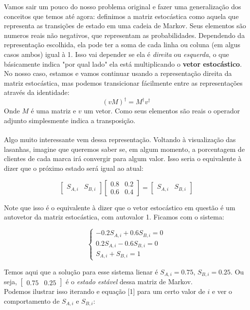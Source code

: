 \documentclass[12pt]{article}
\begin{document}
Vamos sair um pouco do nosso problema original e fazer uma generalização dos conceitos que temos até agora: definimos a matriz estocástica como aquela que representa as transições de estado em uma cadeia de Markov. Seus elementos são numeros reais não negativos, que representam as probabilidades. Dependendo da representação escolhida, ela pode ter a soma de cada linha ou coluna (em algus casos ambos) igual à 1. Isso vai depender se ela é \textit{direita} ou \textit{esquerda}, o que básicamente indica "por qual lado" ela está multiplicando o \textbf{vetor estocástico}. No nosso caso, estamos e vamos continuar usando a representação direita da matriz estocástica, mas podemos transicionar fácilmente entre as representações através da identidade:
\begin{equation}
(vM)^{\dagger} = M^{\dagger} v^{\dagger}
\end{equation}
Onde $M$ é uma matriz e $v$ um vetor. Como seus elementos são reais o operador adjunto simplesmente indica a transposição.\\
\\
Algo muito interessante vem dessa representação. Voltando à visualização das lasanhas, imagine que queremos saber se, em algum momento, a porcentagem de clientes de cada marca irá convergir para algum valor. Isso seria o equivalente à dizer que o próximo estado será igual ao atual:

$$
\begin{bmatrix}
S_{A, i} & S_{B, i}
\end{bmatrix}
\begin{bmatrix}
0.8 & 0.2\\
0.6 & 0.4
\end{bmatrix}
=
\begin{bmatrix}
S_{A, i} & S_{B, i}
\end{bmatrix}
$$

Note que isso é o equivalente à dizer que o vetor estocástico em questão é um autovetor da matriz estocástica, com autovalor 1. Ficamos com o sistema:

$$
\left\{
\begin{array}{ll}
-0.2 S_{A, i} + 0.6 S_{B, i} = 0\\
0.2 S_{A, i}  - 0.6 S_{B, i} = 0\\
S_{A, i} + S_{B, i} = 1
\end{array}\right.
$$

Temos aqui que a solução para esse sistema lienar é $S_{A, i} = 0.75$, $S_{B, i} = 0.25$. Ou seja, $\begin{bmatrix} 0.75 & 0.25 \end{bmatrix}$ é o \textit{estado estável} dessa matriz de Markov.\\ 
Podemos ilustrar isso iterando e equação [1] para um certo valor de $i$ e ver o comportamento de $S_{A, i}$ e $S_{B, i}$:
\end{document}
